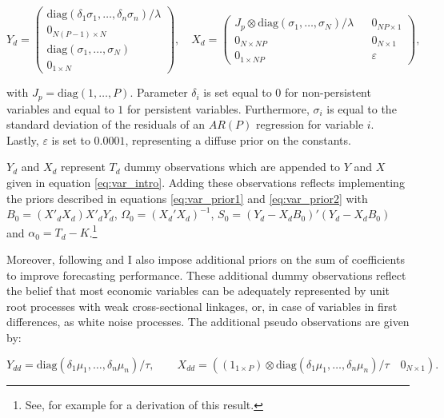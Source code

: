 \documentclass[12pt,letterpaper,fleqn]{article}           %
\begin{document}
\begin{equation} 
Y_d = 
\begin{pmatrix} 
\mbox{diag}(\delta_1 \sigma_1, \ldots, \delta_n \sigma_n) / \lambda \\
0_{N(P - 1) \times N} \\
\mbox{diag}(\sigma_1,\ldots,\sigma_N) \\
0_{1 \times N}
\end{pmatrix},
\quad
X_d = 
\begin{pmatrix}
J_p \otimes \mbox{diag}(\sigma_1,\ldots,\sigma_N) / \lambda && 0_{NP \times 1} \\
0_{N \times NP} && 0_{N \times 1} \\
0_{1 \times NP} && \varepsilon
\end{pmatrix},
\end{equation}

with $J_p = \mbox{diag}(1,\ldots,P)$. Parameter $\delta_i$ is set equal to $0$ for non-persistent variables and equal to $1$ for persistent variables. Furthermore, $\sigma_i$ is equal to the standard deviation of the residuals of an $AR(P)$ regression for variable $i$. Lastly, $\varepsilon$ is set to $0.0001$, representing a diffuse prior on the constants.

$Y_d$ and $X_d$ represent $T_d$ dummy observations which are appended to $Y$ and $X$ given in equation \eqref{eq:var_intro}. Adding these observations reflects implementing the priors described in equations \eqref{eq:var_prior1} and \eqref{eq:var_prior2} with $B_0 = (X'_dX_d)X'_dY_d$, $\Omega_0 = (X_d'X_d)^{-1}$, $S_0 = (Y_d - X_dB_0)'(Y_d - X_dB_0)$ and $\alpha_0 = T_d -K$.\footnote{See, for example \textcite{ricco18} for a derivation of this result.}

Moreover, following \textcite{alessandri17} and \textcite{banbura10} I also impose additional priors on the sum of coefficients to improve forecasting performance.%
These additional dummy observations reflect the belief that most economic variables can be adequately represented by unit root processes with weak cross-sectional linkages, or, in case of variables in first differences, as white noise processes. The additional pseudo observations are given by:

\begin{equation}
Y_{dd} = \mbox{diag}(\delta_1\mu_1,\ldots,\delta_n\mu_n) / \tau, \qquad X_{dd} = ((1_{1 \times P}) \otimes  \mbox{diag}(\delta_1\mu_1,\ldots,\delta_n\mu_n) / \tau \quad 0_{N \times 1}).
\label{prior:sum_coeff}
\end{equation}
\end{document}
